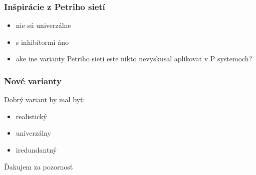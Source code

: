 \documentclass{beamer}
\begin{document}
\begin{frame}[t]\frametitle{Inšpirácie z Petriho sietí}
\begin{itemize}
  \item nie sú univerzálne
  \item s inhibítormi áno
  \item ake ine varianty Petriho sieti este nikto nevyskusal aplikovat v P systemoch?
\end{itemize}
\end{frame}

\begin{frame}[t]\frametitle{Nové varianty}
Dobrý variant by mal byť:
\begin{itemize}
  \item realistický
  \item univerzálny
  \item iredundantný
\end{itemize}
\end{frame}


\begin{frame}[plain]
\begin{center}
  Ďakujem za pozornosť
\end{center}
\end{frame}
\end{document}
